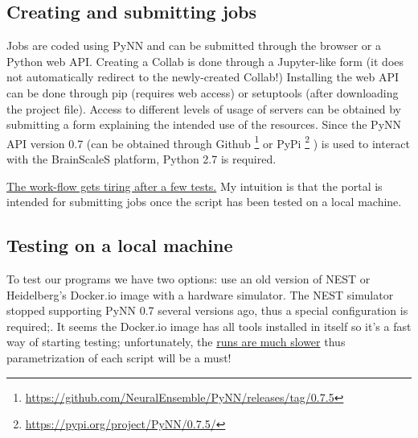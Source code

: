 \documentclass[11pt,a4paper]{article}
\begin{document}
  \subsection{Creating and submitting jobs}
  Jobs are coded using PyNN and can be submitted through the browser or a Python web API.
  Creating a Collab is done through a Jupyter-like form (it does not automatically redirect to the newly-created Collab!)
  Installing the web API can be done through pip (requires web access) or setuptools (after downloading the project file).
  Access to different levels of usage of servers can be obtained by submitting a form explaining the intended use of the resources.
  Since the PyNN API version 0.7 (can be obtained through Github
    \footnote{\url{https://github.com/NeuralEnsemble/PyNN/releases/tag/0.7.5}} 
  or PyPi 
     \footnote{\url{https://pypi.org/project/PyNN/0.7.5/}}
  ) is used to interact with the BrainScaleS platform, Python 2.7 is required.
 
  \underline{The work-flow gets tiring after a few tests.} 
  My intuition is that the portal is intended for submitting jobs once the script has been tested on a local machine. 
 
  \subsection{Testing on a local machine}
  To test our programs we have two options: use an old version of NEST or Heidelberg's Docker.io image with a hardware simulator.
  The NEST simulator stopped supporting PyNN 0.7 several versions ago, thus a special configuration is required;.
  It seems the Docker.io image has all tools installed in itself so it's a fast way of starting testing; unfortunately, the \underline{runs are much slower} thus parametrization of each script will be a must!
 
 
 
 
\end{document}

